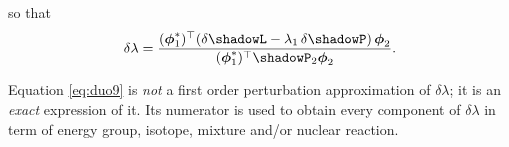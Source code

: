 \noindent so that
\begin{equation}
\delta\lambda={(\bff(\phi)^*_1)^\top(\delta\shadowL -\lambda_1 \, \delta\shadowP) \, \bff(\phi)_2\over (\bff(\phi)^*_1)^\top \shadowP_2 \bff(\phi)_2} .
\label{eq:duo9}
\end{equation}

\vskip 0.08cm

Equation \ref{eq:duo9} is {\sl not} a first order perturbation approximation of $\delta\lambda$; it is an {\sl exact} expression of it. Its numerator is used
to obtain every component of $\delta\lambda$ in term of energy group, isotope, mixture and/or nuclear reaction.
\eject
